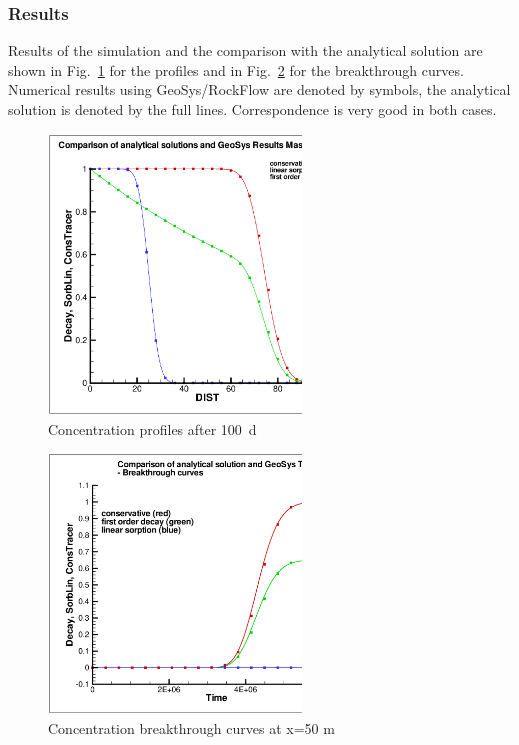 \subsubsection*{Results}

Results of the simulation and the comparison with the analytical solution are shown in Fig.~\ref{l_fig_benchmark_1d_analyt_1} for the profiles and in Fig.~\ref{l_fig_benchmark_1d_analyt_2} for the breakthrough curves. Numerical results using GeoSys/RockFlow are denoted by symbols, the analytical solution is denoted by the full lines. Correspondence is very good in both cases.

\begin{figure}[htbp]
\centering
\includegraphics[width=0.6\textwidth]{C/figures/1d_analyt_profile.eps}
\caption{Concentration profiles after 100~d}
\label{l_fig_benchmark_1d_analyt_1}
\end{figure}


\begin{figure}[htbp]
\centering
\includegraphics[width=0.6\textwidth]{C/figures/1d_analyt_btc.eps}
\caption{Concentration breakthrough curves at x=50 m }
\label{l_fig_benchmark_1d_analyt_2}
\end{figure}



